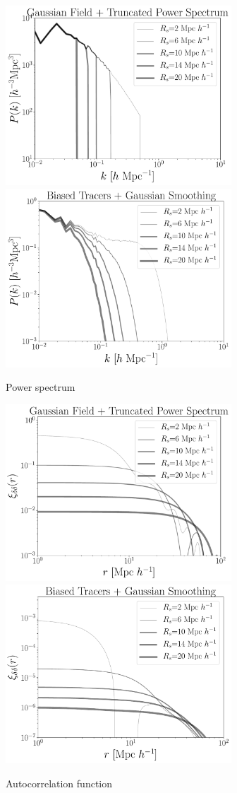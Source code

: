 \documentclass[usenatbib]{mnras}
\begin{document}
\begin{figure}
    \centering
    \includegraphics[width=240pt]{plot_power_spectrum_field_rs.pdf}
    \includegraphics[width=240pt]{plot_power_spectrum_tracers_rs.pdf}
    \caption{Power spectrum}
    \label{fig:power_spectrum}
\end{figure}

\begin{figure}
    \centering
    \includegraphics[width=240pt]{plot_corrfunc_field_rs.pdf}
    \includegraphics[width=240pt]{plot_corrfunc_tracers_rs.pdf}
    \caption{Autocorrelation function}
    \label{fig:autocorrelation}
\end{figure}
\end{document}
